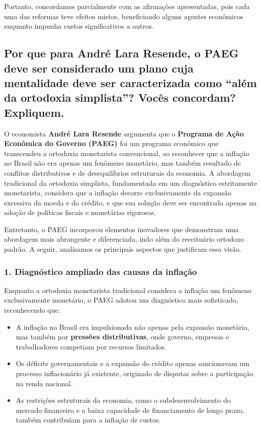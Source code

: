 \documentclass[a4paper,12pt]{article}[abntex2]
\begin{document}
Portanto, concordamos parcialmente com as afirmações apresentadas, pois cada uma das reformas teve efeitos mistos, beneficiando alguns agentes econômicos enquanto impunha custos significativos a outros.

\subsection{\textbf{Por que para André Lara Resende, o PAEG deve ser considerado um plano cuja mentalidade deve ser caracterizada como “além da ortodoxia simplista”? Vocês concordam? Expliquem.}}

O economista \textbf{André Lara Resende} argumenta que o \textbf{Programa de Ação Econômica do Governo (PAEG)} foi um programa econômico que transcendeu a ortodoxia monetarista convencional, ao reconhecer que a inflação no Brasil não era apenas um fenômeno monetário, mas também resultado de conflitos distributivos e de desequilíbrios estruturais da economia. A abordagem tradicional da ortodoxia simplista, fundamentada em um diagnóstico estritamente monetarista, considera que a inflação decorre exclusivamente da expansão excessiva da moeda e do crédito, e que sua solução deve ser encontrada apenas na adoção de políticas fiscais e monetárias rigorosas.

Entretanto, o PAEG incorporou elementos inovadores que demonstram uma abordagem mais abrangente e diferenciada, indo além do receituário ortodoxo padrão. A seguir, analisamos os principais aspectos que justificam essa visão.

\subsubsection{1. Diagnóstico ampliado das causas da inflação}
Enquanto a ortodoxia monetarista tradicional considera a inflação um fenômeno exclusivamente monetário, o PAEG adotou um diagnóstico mais sofisticado, reconhecendo que:
\begin{itemize}
    \item A inflação no Brasil era impulsionada não apenas pela expansão monetária, mas também por \textbf{pressões distributivas}, onde governo, empresas e trabalhadores competiam por recursos limitados.
    \item Os déficits governamentais e a expansão do crédito apenas sancionavam um processo inflacionário já existente, originado de disputas sobre a participação na renda nacional.
    \item As restrições estruturais da economia, como o subdesenvolvimento do mercado financeiro e a baixa capacidade de financiamento de longo prazo, também contribuíam para a inflação de custos.
\end{itemize}
\end{document}
